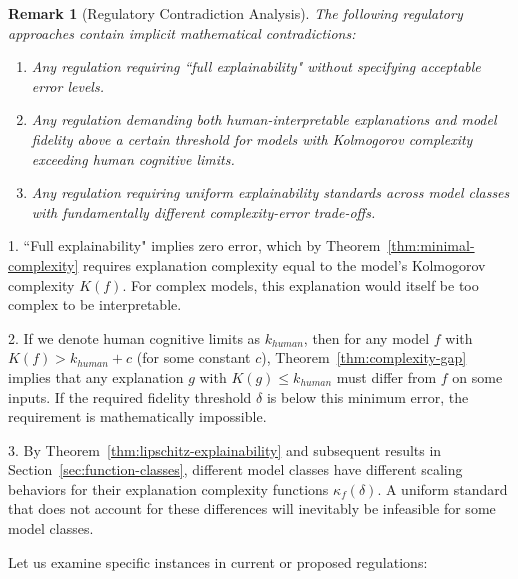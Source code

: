 \documentclass[11pt,letter,leqno]{article}
\newtheorem{remark}[theorem]{Remark}
\begin{document}
\begin{remark}[Regulatory Contradiction Analysis]
\label{thm:contradiction}
The following regulatory approaches contain implicit mathematical contradictions:
\begin{enumerate}
\item Any regulation requiring ``full explainability" without specifying acceptable error levels.
\item Any regulation demanding both human-interpretable explanations and model fidelity above a certain threshold for models with Kolmogorov complexity exceeding human cognitive limits.
\item Any regulation requiring uniform explainability standards across model classes with fundamentally different complexity-error trade-offs.
\end{enumerate}
\end{remark}

1. ``Full explainability" implies zero error, which by Theorem~\ref{thm:minimal-complexity} requires explanation complexity equal to the model's Kolmogorov complexity $K(f)$.  For complex models, this explanation would itself be too complex to be interpretable.

2. If we denote human cognitive limits as $k_{human}$, then for any model $f$ with $K(f) > k_{human} + c$ (for some constant $c$), Theorem~\ref{thm:complexity-gap} implies that any explanation $g$ with $K(g) \leq k_{human}$ must differ from $f$ on some inputs.  If the required fidelity threshold $\delta$ is below this minimum error, the requirement is mathematically impossible.

3. By Theorem~\ref{thm:lipschitz-explainability} and subsequent results in Section~\ref{sec:function-classes}, different model classes have different scaling behaviors for their explanation complexity functions $\kappa_f(\delta)$.  A uniform standard that does not account for these differences will inevitably be infeasible for some model classes.

Let us examine specific instances in current or proposed regulations:
\end{document}
